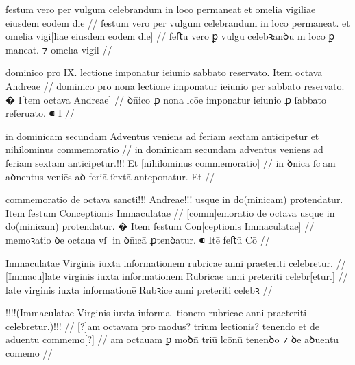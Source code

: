 

\ex \bg
\gla
festum vero per vulgum celebrandum in loco permaneat et omelia vigiliae eiusdem eodem die 
//
\glRekonstrukcja
festum vero per vulgum celebrandum in loco permaneat. et omelia vigi[liae eiusdem eodem die]
//
\glU
{}
feﬅū vero ꝑ vulgū celebꝛanꝺū ın loco {ꝑ maneat.} ⁊ omelıa vigil   
//
\endgl
\eg




\ex \bg
\gla
{}
dominico pro IX. {} lectione imponatur ieiunio
{} sabbato reservato.
{} Item octava Andreae 
//
\glRekonstrukcja
{}
dominico pro {} nona lectione imponatur ieiunio per
sabbato reservato.
� I[tem octava Andreae]
//
\glU
{}
ꝺn̄ico ꝓ {} nona lcōe imponatur ieiunio ꝓ ſabbato reſeruato. ⁌ I  
//
\endgl
\eg


\ex \bg
\gla
{}
in dominicam secundam Adventus veniens
ad feriam sextam anticipetur et nihilominus commemoratio
//
\glRekonstrukcja
{}
in dominicam secundam adventus veniens
ad feriam sextam anticipetur.!!! Et [nihilominus commemoratio]
//
\glU
{}
in ꝺn̄icā ſcam aꝺnentus veniēs aꝺ feriā ſextā anteponatur. Et  
//
\endgl
\eg



\ex \bg
\gla
{}
commemoratio de octava
sancti!!! Andreae!!! usque in do(minicam) protendatur.
{} Item festum Conceptionis Immaculatae
//
\glRekonstrukcja
{}
[comm]emoratio de octava
{} {} usque in do(minicam) protendatur.
� Item festum Con[ceptionis Immaculatae]
//
\glU
{}
memoꝛatio ꝺe octaua {} {} vſ in ꝺn̄ıcā ꝓtenꝺatur. ⁌ Itē feﬅū Cō 
//
\endgl
\eg



\ex \bg
\gla
{}
Immaculatae Virginis iuxta informationem rubricae anni praeteriti celebretur.
//
\glRekonstrukcja
{}
[Immacu]late virginis iuxta informationem Rubricae anni preteriti celebr[etur.]
//
\glU
{}
late virginis iuxta informationē Rubꝛice anni preteriti celebꝛ
//
\endgl
\eg



\ex \bg
\gla
{}
!!!!(Immaculatae Virginis iuxta informa-
tionem rubricae anni praeteriti celebretur.)!!!
//
\glRekonstrukcja
{}
[?]am octavam pro modus? trium lectionis? tenendo et de aduentu commemo[?]
//
\glU
{}
am octauam ꝑ moꝺn̄ triū lcōnū tenenꝺo ⁊ ꝺe aꝺuentu cōmemo
//
\endgl
\eg



